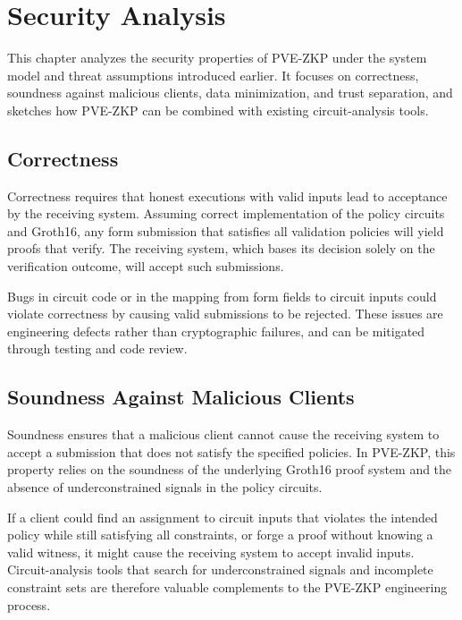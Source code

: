 
\chapter{Security Analysis}

This chapter analyzes the security properties of PVE-ZKP under the system model
and threat assumptions introduced earlier. It focuses on correctness, soundness
against malicious clients, data minimization, and trust separation, and sketches
how PVE-ZKP can be combined with existing circuit-analysis tools.

\section{Correctness}

Correctness requires that honest executions with valid inputs lead to
acceptance by the receiving system. Assuming correct implementation of the
policy circuits and Groth16, any form submission that satisfies all validation
policies will yield proofs that verify. The receiving system, which bases its
decision solely on the verification outcome, will accept such submissions.

Bugs in circuit code or in the mapping from form fields to circuit inputs could
violate correctness by causing valid submissions to be rejected. These issues
are engineering defects rather than cryptographic failures, and can be mitigated
through testing and code review.

\section{Soundness Against Malicious Clients}

Soundness ensures that a malicious client cannot cause the receiving system to
accept a submission that does not satisfy the specified policies. In PVE-ZKP,
this property relies on the soundness of the underlying Groth16 proof system
and the absence of underconstrained signals in the policy circuits.

If a client could find an assignment to circuit inputs that violates the
intended policy while still satisfying all constraints, or forge a proof without
knowing a valid witness, it might cause the receiving system to accept invalid
inputs. Circuit-analysis tools that search for underconstrained signals and
incomplete constraint sets are therefore valuable complements to the PVE-ZKP
engineering process.


